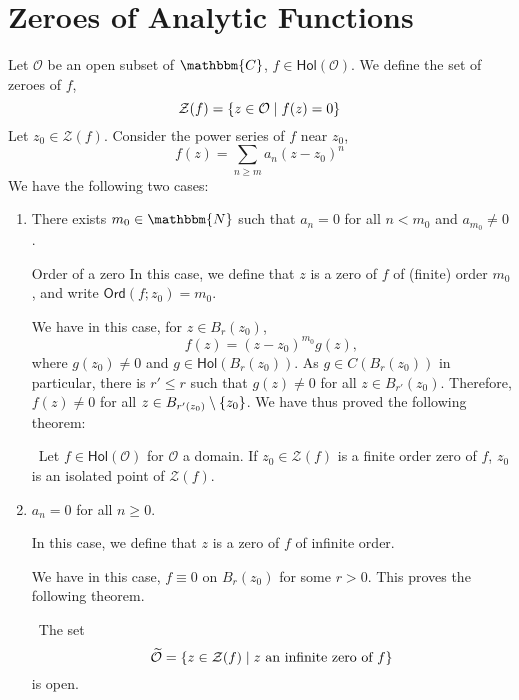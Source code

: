 \documentclass[../ComplexAnalysis_Notes.tex]{subfiles}
\begin{document}
\section{Zeroes of Analytic Functions}
Let \( \mathcal{O} \) be an open subset of \( \mathbbm{C} \), \( f \in \textsf{Hol}(\mathcal{O}) \). We define the set of zeroes of \( f \),
\[ 
 \mathcal{Z}(f) = \qty{z \in \mathcal{O} \mid f(z) = 0}
 \]
Let \( z_0 \in \mathcal{Z}(f) \). Consider the power series of \( f \) near \( z_0 \),
\[ 
 f(z) = \sum_{n\geq m} a_n (z-z_0)^n
 \]
We have the following two cases:
\begin{enumerate}[label = (\roman*)]
  \item There exists \( m_0 \in \mathbbm{N} \) such that \( a_n = 0 \) for all \( n < m_0 \) and \( a_{m_0} \neq 0 \).
  \smallskip

  \begin{Def}{Order of a zero}{}
   In this case, we define that \( z \) is a zero of \( f \) of (finite) order \( m_0 \), and write \( \textsf{Ord}(f;z_0) = m_0 \).
   \end{Def}

   We have in this case, for \( z \in B_r(z_0) \),
   \[ 
    f(z) = (z-z_0)^{m_0}g(z),
    \]
where \( g(z_0) \neq 0 \) and \( g \in \textsf{Hol}(B_r(z_0)) \). As \( g \in C(B_r(z_0)) \) in particular, there is \( r' \leq r \) such that \( g(z) \neq 0 \) for all \( z \in B_{r'}(z_0) \). Therefore, \( f(z) \neq 0 \) for all \( z \in B_{r'(z_0)} \setminus \qty{z_0} \). We have thus proved the following theorem:

\begin{Thm}{}{}
 \, Let \( f \in \textsf{Hol}(\mathcal{O}) \) for \( \mathcal{O} \) a domain. If \( z_0 \in \mathcal{Z}(f) \) is a finite order zero of \( f \), \( z_0 \) is an isolated point of \( \mathcal{Z}(f) \).
 \end{Thm}
\pagebreak
 
 \item \( a_n = 0 \) for all \( n \geq 0 \). 
 \smallskip

 \begin{Def}{}{}
  In this case, we define that \( z \) is a zero of \( f \) of infinite order.
  \end{Def}

  We have in this case, \( f \equiv 0 \) on \( B_r(z_0) \) for some \( r > 0 \). This proves the following theorem.
  \begin{Thm}{}{}
   \, The set
   \[ 
    \widetilde{\mathcal{O}} = \qty{z \in \mathcal{Z}(f) \mid z \text{ an infinite zero of } f}
    \]
    is open.
   \end{Thm}
\end{enumerate}
\end{document}
